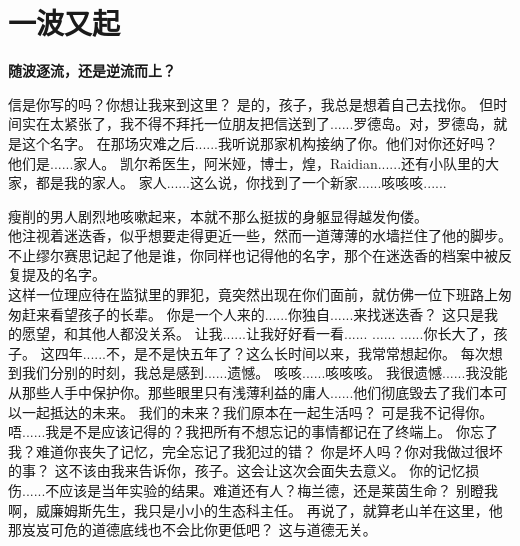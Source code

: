 \documentclass[openany]{book}
\begin{document}
\chapter{一波又起}
\begin{center} \textbf{随波逐流，还是逆流而上？}\end{center} \par
\clearpage
\begin{dialogue}
     信是你写的吗？你想让我来到这里？
     是的，孩子，我总是想着自己去找你。
     但时间实在太紧张了，我不得不拜托一位朋友把信送到了......罗德岛。对，罗德岛，就是这个名字。
     在那场灾难之后......我听说那家机构接纳了你。他们对你还好吗？
     他们是......家人。
     凯尔希医生，阿米娅，博士，煌，Raidian......还有小队里的大家，都是我的家人。
     家人......这么说，你找到了一个新家......咳咳咳......\par
    瘦削的男人剧烈地咳嗽起来，本就不那么挺拔的身躯显得越发佝偻。\\
    他注视着迷迭香，似乎想要走得更近一些，然而一道薄薄的水墙拦住了他的脚步。\\
    不止缪尔赛思记起了他是谁，你同样也记得他的名字，那个在迷迭香的档案中被反复提及的名字。\\
    这样一位理应待在监狱里的罪犯，竟突然出现在你们面前，就仿佛一位下班路上匆匆赶来看望孩子的长辈。
     你是一个人来的......你独自......来找迷迭香？
     这只是我的愿望，和其他人都没关系。
     让我......让我好好看一看......
     ......
     ......你长大了，孩子。
     这四年......不，是不是快五年了？这么长时间以来，我常常想起你。
     每次想到我们分别的时刻，我总是感到......遗憾。
     咳咳......咳咳咳。
     我很遗憾......我没能从那些人手中保护你。那些眼里只有浅薄利益的庸人......他们彻底毁去了我们本可以一起抵达的未来。
     我们的未来？我们原本在一起生活吗？
     可是我不记得你。
     唔......我是不是应该记得的？我把所有不想忘记的事情都记在了终端上。
     你忘了我？难道你丧失了记忆，完全忘记了我犯过的错？
     你是坏人吗？你对我做过很坏的事？
     这不该由我来告诉你，孩子。这会让这次会面失去意义。
     你的记忆损伤......不应该是当年实验的结果。难道还有人？梅兰德，还是莱茵生命？
     别瞪我啊，威廉姆斯先生，我只是小小的生态科主任。
     再说了，就算老山羊在这里，他那岌岌可危的道德底线也不会比你更低吧？
     这与道德无关。

\end{dialogue}
\end{document}
